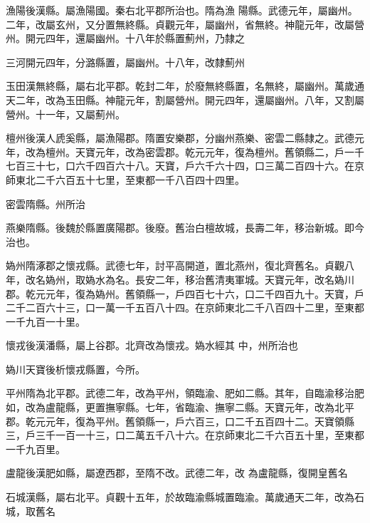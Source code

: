 \begin{pinyinscope}
 漁陽後漢縣。屬漁陽國。秦右北平郡所治也。隋為漁
 陽縣。武德元年，屬幽州。二年，改屬玄州，又分置無終縣。貞觀元年，屬幽州，省無終。神龍元年，改屬營州。開元四年，還屬幽州。十八年於縣置薊州，乃隸之



 三河開元四年，分潞縣置，屬幽州。十八年，改隸薊州



 玉田漢無終縣，屬右北平郡。乾封二年，於廢無終縣置，名無終，屬幽州。萬歲通天二年，改為玉田縣。神龍元年，割屬營州。開元四年，還屬幽州。八年，又割屬營州。十一年，又屬薊州。



 檀州後漢人虒奚縣，屬漁陽郡。隋置安樂郡，分幽州燕樂、密雲二縣隸之。武德元年，改為檀州。天寶元年，改為密雲郡。乾元元年，復為檀州。舊領縣二，戶一千七百三十七，口六千四百六十八。天寶，戶六千六十四，口三萬二百四十六。在京師東北二千六百五十七里，至東都一千八百四十四里。



 密雲隋縣。州所治



 燕樂隋縣。後魏於縣置廣陽郡。後廢。舊治白檀故城，長壽二年，移治新城。即今治也。



 媯州隋涿郡之懷戎縣。武德七年，討平高開道，置北燕州，復北齊舊名。貞觀八年，改名媯州，取媯水為名。長安二年，移治舊清夷軍城。天寶元年，改名媯川郡。乾元元年，復為媯州。舊領縣一，戶四百七十六，口二千四百九十。天寶，戶二千二百六十三，口一萬一千五百八十四。在京師東北二千八百四十二里，至東都一千九百一十里。



 懷戎後漢潘縣，屬上谷郡。北齊改為懷戎。媯水經其
 中，州所治也



 媯川天寶後析懷戎縣置，今所。



 平州隋為北平郡。武德二年，改為平州，領臨渝、肥如二縣。其年，自臨渝移治肥如，改為盧龍縣，更置撫寧縣。七年，省臨渝、撫寧二縣。天寶元年，改為北平郡。乾元元年，復為平州。舊領縣一，戶六百三，口二千五百四十二。天寶領縣三，戶三千一百一十三，口二萬五千八十六。在京師東北二千六百五十里，至東都一千九百里。



 盧龍後漢肥如縣，屬遼西郡，至隋不改。武德二年，改
 為盧龍縣，復開皇舊名



 石城漢縣，屬右北平。貞觀十五年，於故臨渝縣城置臨渝。萬歲通天二年，改為石城，取舊名




\end{pinyinscope}
